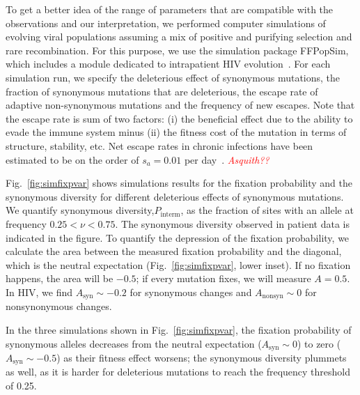 \documentclass[rmp, twocolumn]{revtex4}
\newcommand{\comment}[1]{\textit{\textcolor{red}{#1}}}
\newcommand{\FIG}[1]{Fig.~\ref{fig:#1}}
\begin{document}
To get a better idea of the range of parameters that are compatible with the
observations and our interpretation, we performed computer simulations of
evolving viral populations assuming a mix of positive and purifying selection
and rare recombination.
For this purpose, we use the simulation package FFPopSim, which includes a
module dedicated to intrapatient HIV evolution~\citep{zanini_ffpopsim:_2012}. 
For each simulation run, we specify the deleterious effect of synonymous
mutations, the fraction of synonymous mutations that are deleterious, the
escape rate of adaptive non-synonymous mutations and the frequency of new
escapes. Note that the escape rate is sum of two factors: (i) the beneficial
effect due to the ability to evade the immune system minus (ii) the fitness
cost of the mutation in terms of structure, stability, etc. Net escape rates
in chronic infections have been estimated to be on the order of 
$s_a = 0.01$ per day~\citep{neher_recombination_2010, Asquith}.
\comment{Asquith??}

\FIG{simfixpvar} shows simulations results for the fixation probability and the
synonymous diversity for different deleterious effects of synonymous mutations. 
We quantify synonymous diversity,$P_\text{interm}$, as the fraction of sites
with an allele at frequency $0.25 < \nu < 0.75$. The synonymous diversity
observed in patient data is indicated in the figure.
To quantify the depression of the fixation probability, we calculate
the area between the measured fixation probability and the diagonal, which is
the neutral expectation (\FIG{simfixpvar}, lower inset). If no fixation happens,
the area will be $-0.5$; if every mutation fixes, we will measure 
$A= 0.5$. In HIV, we find $A_\text{syn} \sim -0.2$  for
synonymous changes and $A_\text{nonsyn} \sim 0$ for nonsynonymous changes.

In the three simulations shown in \FIG{simfixpvar}, the fixation probability of
synonymous alleles decreases from the neutral expectation ($A_\text{syn} \sim 0$) to zero
($A_\text{syn} \sim -0.5$) as their fitness effect
worsens; the synonymous diversity plummets as well, as it is harder for
deleterious mutations to reach the frequency threshold of 0.25.
\end{document}
